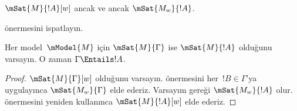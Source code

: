 \documentclass[../../../include/open-logic-section]{subfiles}
\begin{document}
\begin{prop}
  $\mSat{M}{!A}[w]$ ancak ve ancak $\mSat{M_w}{!A}$.
\end{prop}

\begin{prob}
   önermesini ispatlayın.
\end{prob}

\begin{prop}
  Her model~$\mModel{M}$ için $\mSat{M}{\Gamma}$ ise
  $\mSat{M}{!A}$ olduğunu varsayın. O zaman $\Gamma \Entails !A$.
\end{prop}

\begin{proof}
  $\mSat{M}{\Gamma}[w]$ olduğunu varsayın.  önermesini
  her~$!B \in \Gamma$'ya uygulayınca $\mSat{M_w}{\Gamma}$ elde ederiz.
  Varsayım gereği $\mSat{M_w}{!A}$ olur.  önermesini
  yeniden kullanınca $\mSat{M}{!A}[w]$ elde ederiz.
\end{proof}
\end{document}
